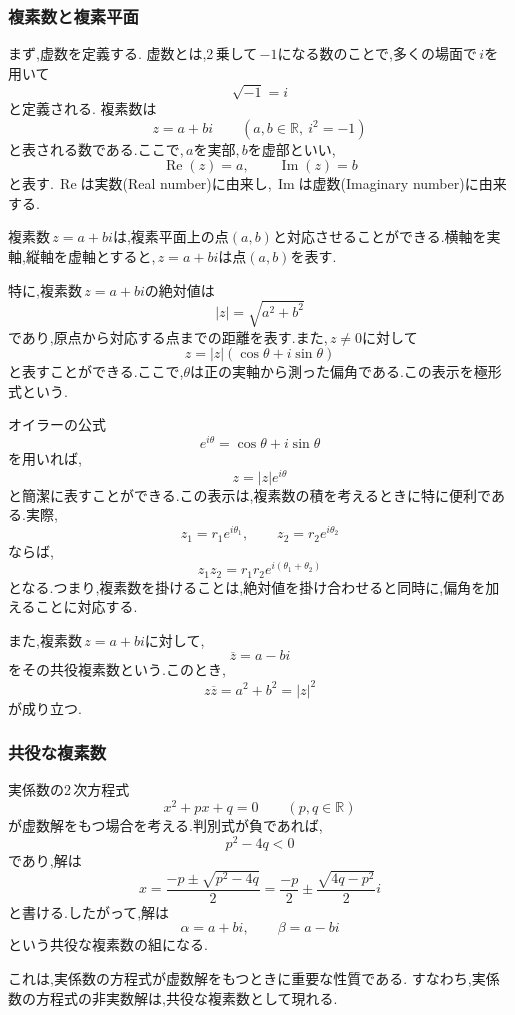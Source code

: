 \subsubsection{複素数と複素平面}
  まず,虚数を定義する.
  虚数とは,2\,乗して\,$-1$になる数のことで,多くの場面で\,$i$を用いて
  \[
    \sqrt{-1}=i
  \]
  と定義される.
  複素数は
  \[
    z=a+bi\qquad (a,b\in\mathbb{R},\ i^2=-1)
  \]
  と表される数である.ここで,\,$a$を実部,\,$b$を虚部といい,
  \[
    \operatorname{Re}(z)=a,\qquad \operatorname{Im}(z)=b
  \]
  と表す.\,$\operatorname{Re}$は実数(Real number)に由来し,\,$\operatorname{Im}$は虚数(Imaginary number)に由来する.

  複素数\,$z=a+bi$は,複素平面上の点$(a,b)$と対応させることができる.横軸を実軸,縦軸を虚軸とすると,\,$z=a+bi$は点$(a,b)$を表す.

  特に,複素数\,$z=a+bi$の絶対値は
  \[
    |z|=\sqrt{a^2+b^2}
  \]
  であり,原点から対応する点までの距離を表す.また,\,$z\neq0$に対して
  \[
    z=|z|(\cos\theta+i\sin\theta)
  \]
  と表すことができる.ここで,$\theta$は正の実軸から測った偏角である.この表示を極形式という.

  オイラーの公式
  \[
    e^{i\theta}=\cos\theta+i\sin\theta
  \]
  を用いれば,
  \[
    z=|z|e^{i\theta}
  \]
  と簡潔に表すことができる.この表示は,複素数の積を考えるときに特に便利である.実際,
  \[
    z_1=r_1e^{i\theta_1},\qquad z_2=r_2e^{i\theta_2}
  \]
  ならば,
  \[
    z_1z_2=r_1r_2e^{i(\theta_1+\theta_2)}
  \]
  となる.つまり,複素数を掛けることは,絶対値を掛け合わせると同時に,偏角を加えることに対応する.

  また,複素数\,$z=a+bi$に対して,
  \[
    \overline{z}=a-bi
  \]
  をその共役複素数という.このとき,
  \[
    z\overline{z}=a^2+b^2=|z|^2
  \]
  が成り立つ.

\subsubsection{共役な複素数}
  実係数の2\,次方程式
  \[
    x^2+px+q=0\qquad (p,q\in\mathbb{R})
  \]
  が虚数解をもつ場合を考える.判別式が負であれば,
  \[
    p^2-4q<0
  \]
  であり,解は
  \[
    x=\frac{-p\pm\sqrt{p^2-4q}}{2}
    =\frac{-p}{2}\pm\frac{\sqrt{4q-p^2}}{2}i
  \]
  と書ける.したがって,解は
  \[
    \alpha=a+bi,\qquad \beta=a-bi
  \]
  という共役な複素数の組になる.

  これは,実係数の方程式が虚数解をもつときに重要な性質である.
  すなわち,実係数の方程式の非実数解は,共役な複素数として現れる.